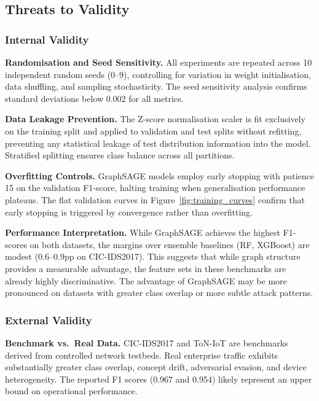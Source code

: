 \documentclass[conference]{IEEEtran}
\begin{document}
\subsection{Threats to Validity}
\label{sec:threats}

\subsubsection{Internal Validity}

\textbf{Randomisation and Seed Sensitivity.} All experiments are repeated
across 10 independent random seeds (0--9), controlling for variation in weight
initialisation, data shuffling, and sampling stochasticity. The seed sensitivity
analysis confirms standard deviations below 0.002 for all metrics.

\textbf{Data Leakage Prevention.} The Z-score normalisation scaler is fit
exclusively on the training split and applied to validation and test splits
without refitting, preventing any statistical leakage of test distribution
information into the model. Stratified splitting ensures class balance across
all partitions.

\textbf{Overfitting Controls.} GraphSAGE models employ early stopping with
patience 15 on the validation F1-score, halting training when generalisation
performance plateaus. The flat validation curves in Figure~\ref{fig:training_curves}
confirm that early stopping is triggered by convergence rather than overfitting.

\textbf{Performance Interpretation.} While GraphSAGE achieves the highest
F1-scores on both datasets, the margins over ensemble baselines (RF, XGBoost)
are modest (0.6--0.9pp on CIC-IDS2017). This suggests that while graph
structure provides a measurable advantage, the feature sets in these benchmarks
are already highly discriminative. The advantage of GraphSAGE may be more
pronounced on datasets with greater class overlap or more subtle attack
patterns.

\subsubsection{External Validity}

\textbf{Benchmark vs.\ Real Data.} CIC-IDS2017 and ToN-IoT are benchmarks
derived from controlled network testbeds. Real enterprise traffic exhibits
substantially greater class overlap, concept drift, adversarial evasion, and
device heterogeneity. The reported F1 scores (0.967 and 0.954) likely represent
an upper bound on operational performance.
\end{document}

